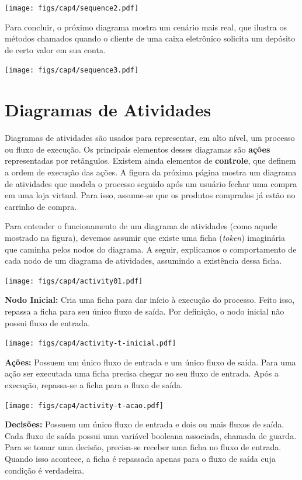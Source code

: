 \documentclass[
  11pt,
  twoside]{book}
\begin{document}
\texttt{[image: figs/cap4/sequence2.pdf]}

Para concluir, o próximo diagrama mostra um cenário mais real, que
ilustra os métodos chamados quando o cliente de uma caixa eletrônico
solicita um depósito de certo valor em sua conta.

\texttt{[image: figs/cap4/sequence3.pdf]}

\hypertarget{diagramas-de-atividades}{%
\section{Diagramas de Atividades}\label{diagramas-de-atividades}}

 

Diagramas de atividades são usados para representar, em alto nível, um
processo ou fluxo de execução. Os principais elementos desses diagramas
são \textbf{ações} representadas por retângulos. Existem ainda elementos
de \textbf{controle}, que definem a ordem de execução das ações. A
figura da próxima página mostra um diagrama de atividades que modela o
processo seguido após um usuário fechar uma compra em uma loja virtual.
Para isso, assume-se que os produtos comprados já estão no carrinho de
compra.

Para entender o funcionamento de um diagrama de atividades (como aquele
mostrado na figura), devemos assumir que existe uma ficha (\emph{token})
imaginária que caminha pelos nodos do diagrama. A seguir, explicamos o
comportamento de cada nodo de um diagrama de atividades, assumindo a
existência dessa ficha.

\newpage

\texttt{[image: figs/cap4/activity01.pdf]}

\textbf{Nodo Inicial:} Cria uma ficha para dar início à execução do
processo. Feito isso, repassa a ficha para seu único fluxo de saída. Por
definição, o nodo inicial não possui fluxo de entrada.

\texttt{[image: figs/cap4/activity-t-inicial.pdf]}

\textbf{Ações:} Possuem um único fluxo de entrada e um único fluxo de
saída. Para uma ação ser executada uma ficha precisa chegar no seu fluxo
de entrada. Após a execução, repassa-se a ficha para o fluxo de saída.

\texttt{[image: figs/cap4/activity-t-acao.pdf]}

\textbf{Decisões:} Possuem um único fluxo de entrada e dois ou mais
fluxos de saída. Cada fluxo de saída possui uma variável booleana
associada, chamada de guarda. Para se tomar uma decisão, precisa-se
receber uma ficha no fluxo de entrada. Quando isso acontece, a ficha é
repassada apenas para o fluxo de saída cuja condição é verdadeira.
\end{document}
